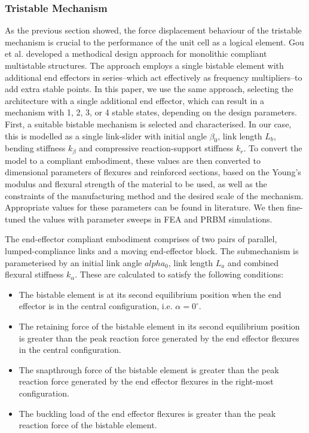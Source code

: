 \subsubsection*{Tristable Mechanism}
As the previous section showed, the force displacement behaviour of the tristable mechanism is crucial to the performance of the unit cell as a logical element. Gou et al. \cite{Gou2021} developed a methodical design approach for monolithic compliant multistable structures. The approach employs a single bistable element with additional end effectors in series--which act effectively as frequency multipliers--to add extra stable points. In this paper, we use the same approach, selecting the architecture with a single additional end effector, which can result in a mechanism with 1, 2, 3, or 4 stable states, depending on the design parameters. First, a suitable bistable mechanism is selected and characterised. 
In our case, this is modelled as a single link-slider with initial angle \(\beta_0\), link length \(L_b\), bending stiffness \(k_\beta\) and compressive reaction-support stiffness \(k_r\). To convert the model to a compliant embodiment, these values are then converted to dimensional parameters of flexures and reinforced sections, based on the Young's modulus and flexural strength of the material to be used, as well as the constraints of the manufacturing method and the desired scale of the mechanism. 
Appropriate values for these parameters can be found in literature. We then fine-tuned the values with parameter sweeps in FEA and PRBM simulations. 

The end-effector compliant embodiment comprises of two pairs of parallel, lumped-compliance links and a moving end-effector block. The submechanism is parameterised by an initial link angle \(alpha_0\), link length \(L_a\) and combined flexural stiffness \(k_\alpha\). These are calculated to satisfy the following conditions: 
\begin{itemize}
    \item The bistable element is at its second equilibrium position when the end effector is in the central configuration, i.e. \(\alpha = 0^\circ\).
    \item The retaining force of the bistable element in its second equilibrium position is greater than the peak reaction force generated by the end effector flexures in the central configuration.
    \item The snapthrough force of the bistable element is greater than the peak reaction force generated by the end effector flexures in the right-most configuration.
    \item The buckling load of the end effector flexures is greater than the peak reaction force of the bistable element.
\end{itemize} 

